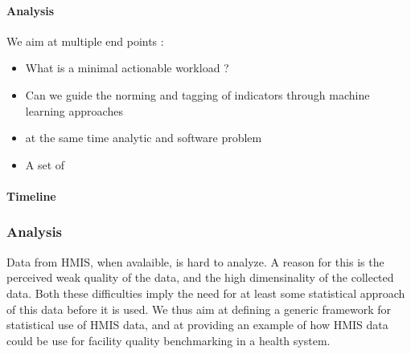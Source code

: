 \documentclass[a4paper,11pt,final,twoside]{article}
\begin{document}
\paragraph{Analysis} We aim at multiple end points :
\begin{itemize}
    \item What is a minimal actionable workload ?
    \item Can we guide the norming and tagging of indicators through machine learning approaches
    \item at the same time analytic and software problem
\end{itemize}

\begin{itemize}
    \item A set of
\end{itemize}

\paragraph{Timeline}


\subsubsection{Analysis}

Data from HMIS, when avalaible, is hard to analyze. A reason for this is the perceived weak quality of the data, and the high dimensinality of the collected data. Both these difficulties imply the need for at least some statistical approach of this data before it is used. We thus aim at defining a generic framework for statistical use of HMIS data, and at providing an example of how HMIS data could be use for facility quality benchmarking in a health system.
\end{document}
